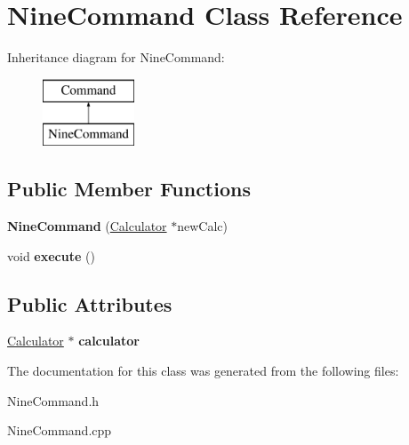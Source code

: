 \hypertarget{class_nine_command}{}\section{Nine\+Command Class Reference}
\label{class_nine_command}
Inheritance diagram for Nine\+Command\+:\begin{figure}[H]
\begin{center}
\leavevmode
\includegraphics[height=2.000000cm]{class_nine_command}
\end{center}
\end{figure}
\subsection*{Public Member Functions}
\begin{DoxyCompactItemize}
\item 
\hypertarget{class_nine_command_a44f89f6ad7fa2a153d4900ae3553bd68}{}{\bfseries Nine\+Command} (\hyperlink{class_calculator}{Calculator} $\ast$new\+Calc)\label{class_nine_command_a44f89f6ad7fa2a153d4900ae3553bd68}

\item 
\hypertarget{class_nine_command_a8574ee5eab651afee7426db0fe2cb2f0}{}void {\bfseries execute} ()\label{class_nine_command_a8574ee5eab651afee7426db0fe2cb2f0}

\end{DoxyCompactItemize}
\subsection*{Public Attributes}
\begin{DoxyCompactItemize}
\item 
\hypertarget{class_nine_command_a3bb8db5764e5c2e3e2025dadf1f81a96}{}\hyperlink{class_calculator}{Calculator} $\ast$ {\bfseries calculator}\label{class_nine_command_a3bb8db5764e5c2e3e2025dadf1f81a96}

\end{DoxyCompactItemize}


The documentation for this class was generated from the following files\+:\begin{DoxyCompactItemize}
\item 
Nine\+Command.\+h\item 
Nine\+Command.\+cpp\end{DoxyCompactItemize}
